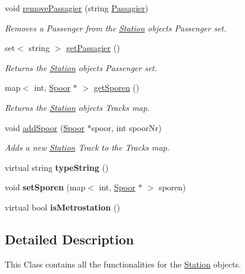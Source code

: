 \begin{DoxyCompactItemize}
void \hyperlink{classStation_aa250b3ba3e62c3d433b4c29f6cca38d4}{remove\+Passagier} (string \hyperlink{classPassagier}{Passagier})
\begin{DoxyCompactList}\small\item\em Removes a Passenger from the \hyperlink{classStation}{Station} object\textquotesingle{}s Passenger set. \end{DoxyCompactList}\item 
set$<$ string $>$ \hyperlink{classStation_a3c25e627a9036778a4d6d08ca1454aa6}{get\+Passagier} ()
\begin{DoxyCompactList}\small\item\em Returns the \hyperlink{classStation}{Station} object\textquotesingle{}s Passenger set. \end{DoxyCompactList}\item 
map$<$ int, \hyperlink{classSpoor}{Spoor} $\ast$ $>$ \hyperlink{classStation_a8ee617b13d4d67d0d3d1384d6d33226f}{get\+Sporen} ()
\begin{DoxyCompactList}\small\item\em Returns the \hyperlink{classStation}{Station} object\textquotesingle{}s Tracks map. \end{DoxyCompactList}\item 
void \hyperlink{classStation_a55911b5e0a355f085afd75391827729f}{add\+Spoor} (\hyperlink{classSpoor}{Spoor} $\ast$spoor, int spoor\+Nr)
\begin{DoxyCompactList}\small\item\em Adds a new \hyperlink{classStation}{Station} Track to the Tracks map. \end{DoxyCompactList}\item 
virtual string {\bfseries type\+String} ()\hypertarget{classStation_ad83c424982c3e8e85d446593cc833141}{}\label{classStation_ad83c424982c3e8e85d446593cc833141}

\item 
void {\bfseries set\+Sporen} (map$<$ int, \hyperlink{classSpoor}{Spoor} $\ast$ $>$ sporen)\hypertarget{classStation_a036804467eb7a7c3bf51a90b4ee57eee}{}\label{classStation_a036804467eb7a7c3bf51a90b4ee57eee}

\item 
virtual bool {\bfseries is\+Metrostation} ()\hypertarget{classStation_a6c9833b35ffe26df4a0b163c9186be07}{}\label{classStation_a6c9833b35ffe26df4a0b163c9186be07}

\end{DoxyCompactItemize}


\subsection{Detailed Description}
This Class contains all the functionalities for the \hyperlink{classStation}{Station} objects. 

